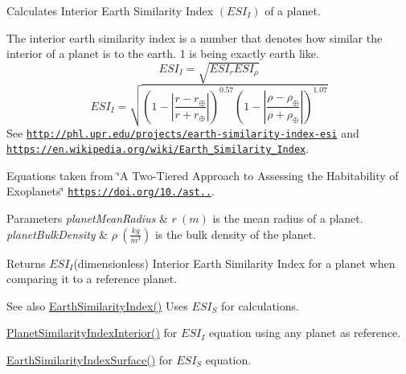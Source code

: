 Calculates Interior Earth Similarity Index $(ESI_I)$ of a planet. 

The interior earth similarity index is a number that denotes how similar the interior of a planet is to the earth. 1 is being exactly earth like. \[ESI_I=\sqrt{ESI_r ESI_\rho}\] \[ESI_I=\sqrt{\left ( 1 - \left | \frac{r-r_\oplus}{r+r_\oplus} \right | \right )^{0.57} \left ( 1 - \left | \frac{\rho-\rho_\oplus}{\rho+\rho_\oplus} \right | \right )^{1.07}}\] See \href{http://phl.upr.edu/projects/earth-similarity-index-esi}{\tt http\+://phl.\+upr.\+edu/projects/earth-\/similarity-\/index-\/esi} and \href{https://en.wikipedia.org/wiki/Earth_Similarity_Index}{\tt https\+://en.\+wikipedia.\+org/wiki/\+Earth\+\_\+\+Similarity\+\_\+\+Index}.

Equations taken from \char`\"{}\+A Two-\/\+Tiered Approach to Assessing the Habitability of Exoplanets\char`\"{} \href{https://doi.org/10.1089/ast.2010.0592}{\tt https\+://doi.\+org/10./ast..}.


\begin{DoxyParams}{Parameters}
{\em planet\+Mean\+Radius} & $r\ (m)$ is the mean radius of a planet. \\
\hline
{\em planet\+Bulk\+Density} & $\rho\ (\frac{kg}{m^3})$ is the bulk density of the planet. \\
\hline
\end{DoxyParams}
\begin{DoxyReturn}{Returns}
$ESI_I$(dimensionless) Interior Earth Similarity Index for a planet when comparing it to a reference planet. 
\end{DoxyReturn}
\begin{DoxySeeAlso}{See also}
\mbox{\hyperlink{group___e_g_x_phys-_planet_criteria_ga4b86397b1c839c49ac599d49fda207d4}{Earth\+Similarity\+Index()}} Uses $ESI_S$ for calculations. 

\mbox{\hyperlink{group___e_g_x_phys-_planet_criteria_ga6dc06a1a8baf6e132abed51fcf410c7f}{Planet\+Similarity\+Index\+Interior()}} for $ESI_I$ equation using any planet as reference. 

\mbox{\hyperlink{group___e_g_x_phys-_planet_criteria_ga1df772b0ed354ca7f7e4a7a4af072325}{Earth\+Similarity\+Index\+Surface()}} for $ESI_S$ equation. 
\end{DoxySeeAlso}
\mbox{\label{group___e_g_x_phys-_planet_criteria_ga1df772b0ed354ca7f7e4a7a4af072325}} 

